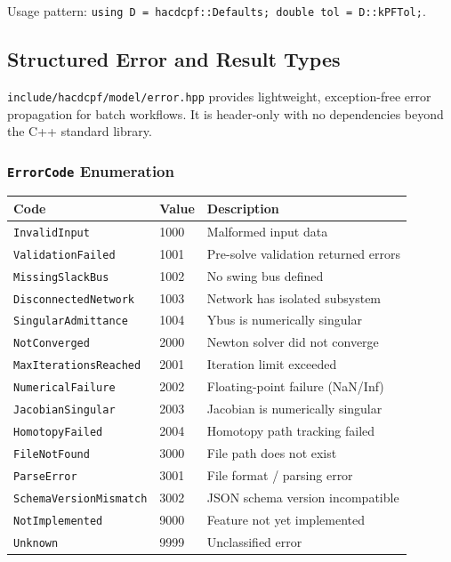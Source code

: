 Usage pattern: \texttt{using D = hacdcpf::Defaults; double tol = D::kPFTol;}.

\subsection{Structured Error and Result Types}
\label{sec:error-result}

\texttt{include/hacdcpf/model/error.hpp} provides lightweight, exception-free
error propagation for batch workflows.  It is header-only with no dependencies
beyond the C++ standard library.

\subsubsection{\texttt{ErrorCode} Enumeration}

\begin{center}
\begin{tabular}{lll}
\hline\hline
\textbf{Code} & \textbf{Value} & \textbf{Description} \\
\hline
\texttt{InvalidInput} & 1000 & Malformed input data \\
\texttt{ValidationFailed} & 1001 & Pre-solve validation returned errors \\
\texttt{MissingSlackBus} & 1002 & No swing bus defined \\
\texttt{DisconnectedNetwork} & 1003 & Network has isolated subsystem \\
\texttt{SingularAdmittance} & 1004 & Ybus is numerically singular \\
\texttt{NotConverged} & 2000 & Newton solver did not converge \\
\texttt{MaxIterationsReached} & 2001 & Iteration limit exceeded \\
\texttt{NumericalFailure} & 2002 & Floating-point failure (NaN/Inf) \\
\texttt{JacobianSingular} & 2003 & Jacobian is numerically singular \\
\texttt{HomotopyFailed} & 2004 & Homotopy path tracking failed \\
\texttt{FileNotFound} & 3000 & File path does not exist \\
\texttt{ParseError} & 3001 & File format / parsing error \\
\texttt{SchemaVersionMismatch} & 3002 & JSON schema version incompatible \\
\texttt{NotImplemented} & 9000 & Feature not yet implemented \\
\texttt{Unknown} & 9999 & Unclassified error \\
\hline\hline
\end{tabular}
\end{center}

